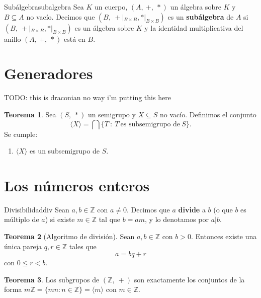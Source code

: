 \documentclass[a4paper]{book}
\theoremstyle{definition}
\newtheorem{theorem}{Teorema}[section]
\theoremstyle{ejemplo}
\theoremstyle{demostracion}
\newcommand{\enteros}{\mathbb{Z}}
\begin{document}
\begin{define}{Subálgebra}{subalgebra}
	Sea $K$ un cuerpo, $(A,\ +,\ *)$ un álgebra sobre $K$ y $B \subseteq A$ no vacío. Decimos que $(B,\ +|_{B \times B}, *|_{B \times B})$ es un \textbf{subálgebra} de $A$ si $(B,\ +|_{B \times B}, *|_{B \times B})$ es un álgebra sobre $K$ y la identidad multiplicativa del anillo $(A,\ +,\ *)$ está en $B$.
\end{define}

\section{Generadores}\label{sec:generadores}
TODO: this is draconian no way i'm putting this here
\begin{theorem}
	Sea $(S,\ *)$ un semigrupo y $X \subseteq S$ no vacío. Definimos el conjunto
	\begin{equation*}
		\langle X \rangle = \bigcap \{T\ :\ T\ \text{es subsemigrupo de}\ S\}.
	\end{equation*}
	Se cumple:
	\begin{enumerate}
		\item
		$\langle X \rangle$ es un subsemigrupo de $S$. 
	\end{enumerate}
\end{theorem}

\section{Los números enteros}
\begin{define}{Divisibilidad}{div}
	Sean $a,b \in \enteros$ con $a \neq 0$. Decimos que $a$ \textbf{divide} a $b$ (o que $b$ es múltiplo de $a$) si existe $m \in \enteros$ tal que $b = am$, y lo denotamos por $a | b$.
\end{define}

\begin{theorem}[Algoritmo de división]
	Sean $a,b \in \enteros$ con $b > 0$. Entonces existe una única pareja $q,r \in \enteros$ tales que
	\begin{equation*}
		a = bq + r
	\end{equation*}
	con $0 \leq r < b$.
\end{theorem}

\begin{theorem}
	Los subgrupos de $(\enteros,\ +)$ son exactamente los conjuntos de la forma $m\enteros = \{ mn : n \in \enteros\} = \langle m \rangle$ con $m \in \enteros$.
\end{theorem}
\end{document}
